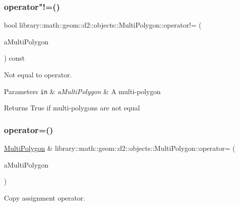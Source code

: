 \subsubsection{\texorpdfstring{operator"!=()}{operator!=()}}
{\footnotesize\ttfamily bool library\+::math\+::geom\+::d2\+::objects\+::\+Multi\+Polygon\+::operator!= (\begin{DoxyParamCaption}\item[{const \hyperlink{classlibrary_1_1math_1_1geom_1_1d2_1_1objects_1_1_multi_polygon}{Multi\+Polygon} \&}]{a\+Multi\+Polygon }\end{DoxyParamCaption}) const}



Not equal to operator. 


\begin{DoxyParams}[1]{Parameters}
\mbox{\tt in}  & {\em a\+Multi\+Polygon} & A multi-\/polygon \\
\hline
\end{DoxyParams}
\begin{DoxyReturn}{Returns}
True if multi-\/polygons are not equal 
\end{DoxyReturn}
\mbox{\label{classlibrary_1_1math_1_1geom_1_1d2_1_1objects_1_1_multi_polygon_abd2fa0b95f3b339dda6e4b8ccd321af0}} 
\subsubsection{\texorpdfstring{operator=()}{operator=()}}
{\footnotesize\ttfamily \hyperlink{classlibrary_1_1math_1_1geom_1_1d2_1_1objects_1_1_multi_polygon}{Multi\+Polygon} \& library\+::math\+::geom\+::d2\+::objects\+::\+Multi\+Polygon\+::operator= (\begin{DoxyParamCaption}\item[{const \hyperlink{classlibrary_1_1math_1_1geom_1_1d2_1_1objects_1_1_multi_polygon}{Multi\+Polygon} \&}]{a\+Multi\+Polygon }\end{DoxyParamCaption})}



Copy assignment operator. 



